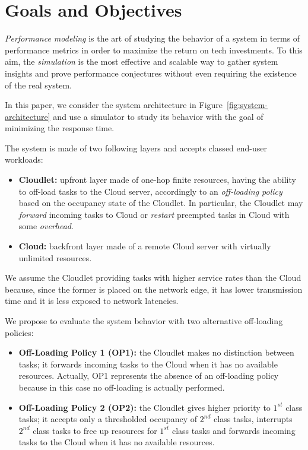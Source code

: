 \section{Goals and Objectives}
\label{sec:performance-modeling-goals-and-objectives}
\textit{Performance modeling} is the art of studying the behavior of a system in terms of performance metrics in order to maximize the return on tech investments.
To this aim, the \textit{simulation} is the most effective and scalable way to gather system insights and prove performance conjectures without even requiring the existence of the real system.

In this paper, we consider the system architecture in Figure~\ref{fig:system-architecture} and use a simulator to study its behavior with the goal of minimizing the response time.

The system is made of two following layers and accepts classed end-user workloads:

\begin{itemize}
		\item \textbf{Cloudlet:} upfront layer made of one-hop finite resources, having the ability to off-load tasks to the Cloud server, accordingly to an \textit{off-loading policy} based on the occupancy state of the Cloudlet. In particular, the Cloudlet may \textit{forward} incoming tasks to Cloud or \textit{restart} preempted tasks in Cloud with some \textit{overhead}. 
		
		\item \textbf{Cloud:} backfront layer made of a remote Cloud server with virtually unlimited resources.
\end{itemize}

We assume the Cloudlet  providing tasks with higher service rates than the Cloud because, since the former is placed on the network edge, it has lower transmission time and it is less exposed to network latencies.

We propose to evaluate the system behavior with two alternative off-loading policies:

\begin{itemize}
	\item \textbf{Off-Loading Policy 1 (OP1):} the Cloudlet makes no distinction between tasks; it forwards incoming tasks to the Cloud when it has no available resources. Actually, OP1 represents the absence of an off-loading policy because in this case no off-loading is actually performed.
	
	\item \textbf{Off-Loading Policy 2 (OP2):} the Cloudlet gives higher priority to $1^{st}$ class tasks; it accepts only a thresholded occupancy of $2^{nd}$ class tasks, interrupts $2^{nd}$ class tasks to free up resources for $1^{st}$ class tasks and forwards incoming tasks to the Cloud when it has no available resources.
\end{itemize}

